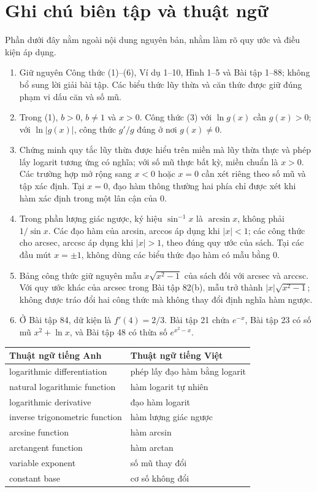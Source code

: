\documentclass[12pt,a4paper]{article}
\begin{document}
\section*{Ghi chú biên tập và thuật ngữ}
Phần dưới đây nằm ngoài nội dung nguyên bản, nhằm làm rõ quy ước và điều kiện áp dụng.
\begin{enumerate}[leftmargin=*]
\item Giữ nguyên Công thức (1)–(6), Ví dụ 1–10, Hình 1–5 và Bài tập 1–88; không bổ sung lời giải bài tập. Các biểu thức lũy thừa và căn thức được giữ đúng phạm vi dấu căn và số mũ.
\item Trong (1), $b>0$, $b\ne1$ và $x>0$. Công thức (3) với $\ln g(x)$ cần $g(x)>0$; với $\ln|g(x)|$, công thức $g'/g$ đúng ở nơi $g(x)\ne0$.
\item Chứng minh quy tắc lũy thừa được hiểu trên miền mà lũy thừa thực và phép lấy logarit tương ứng có nghĩa; với số mũ thực bất kỳ, miền chuẩn là $x>0$. Các trường hợp mở rộng sang $x<0$ hoặc $x=0$ cần xét riêng theo số mũ và tập xác định. Tại $x=0$, đạo hàm thông thường hai phía chỉ được xét khi hàm xác định trong một lân cận của $0$.
\item Trong phần lượng giác ngược, ký hiệu $\sin^{-1}x$ là $\arcsin x$, không phải $1/\sin x$. Các đạo hàm của arcsin, arccos áp dụng khi $|x|<1$; các công thức cho arcsec, arccsc áp dụng khi $|x|>1$, theo đúng quy ước của sách. Tại các đầu mút $x=\pm1$, không dùng các biểu thức đạo hàm có mẫu bằng $0$.
\item Bảng công thức giữ nguyên mẫu $x\sqrt{x^2-1}$ của sách đối với arcsec và arccsc. Với quy ước khác của arcsec trong Bài tập 82(b), mẫu trở thành $|x|\sqrt{x^2-1}$; không được tráo đổi hai công thức mà không thay đổi định nghĩa hàm ngược.
\item Ở Bài tập 84, dữ kiện là $f'(4)=2/3$. Bài tập 21 chứa $e^{-x}$, Bài tập 23 có số mũ $x^2+\ln x$, và Bài tập 48 có thừa số $e^{x^2-x}$.
\end{enumerate}
\begin{longtable}{p{.43\linewidth}p{.49\linewidth}}\toprule
Thuật ngữ tiếng Anh & Thuật ngữ tiếng Việt\\\midrule
logarithmic differentiation & phép lấy đạo hàm bằng logarit\\
natural logarithmic function & hàm logarit tự nhiên\\
logarithmic derivative & đạo hàm logarit\\
inverse trigonometric function & hàm lượng giác ngược\\
arcsine function & hàm arcsin\\
arctangent function & hàm arctan\\
variable exponent & số mũ thay đổi\\
constant base & cơ số không đổi\\\bottomrule
\end{longtable}
\end{document}

